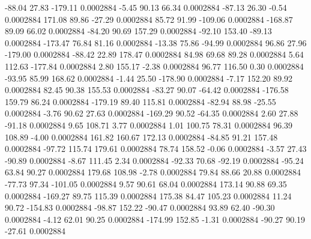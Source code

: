      -88.04       27.83     -179.11     0.0002884
       -5.45       90.13       66.34     0.0002884
      -87.13       26.30       -0.54     0.0002884
      171.08       89.86      -27.29     0.0002884
       85.72       91.99     -109.06     0.0002884
     -168.87       89.09       66.02     0.0002884
      -84.20       90.69      157.29     0.0002884
      -92.10      153.40      -89.13     0.0002884
     -173.47       76.84       81.16     0.0002884
      -13.38       75.86      -94.99     0.0002884
       96.86       27.96     -179.00     0.0002884
      -88.42       22.89      178.47     0.0002884
       84.98       69.68       89.28     0.0002884
        5.64      112.63     -177.84     0.0002884
        2.80      155.17       -2.38     0.0002884
       96.77      116.50        0.30     0.0002884
      -93.95       85.99      168.62     0.0002884
       -1.44       25.50     -178.90     0.0002884
       -7.17      152.20       89.92     0.0002884
       82.45       90.38      155.53     0.0002884
      -83.27       90.07      -64.42     0.0002884
     -176.58      159.79       86.24     0.0002884
     -179.19       89.40      115.81     0.0002884
      -82.94       88.98      -25.55     0.0002884
       -3.76       90.62       27.63     0.0002884
     -169.29       90.52      -64.35     0.0002884
        2.60       27.88      -91.18     0.0002884
        9.65      108.71        3.77     0.0002884
        1.01      100.75       78.31     0.0002884
       96.39      108.89       -4.00     0.0002884
      161.82      160.67      172.13     0.0002884
      -84.85       91.21      157.48     0.0002884
      -97.72      115.74      179.61     0.0002884
       78.74      158.52       -0.06     0.0002884
       -3.57       27.43      -90.89     0.0002884
       -8.67      111.45        2.34     0.0002884
      -92.33       70.68      -92.19     0.0002884
      -95.24       63.84       90.27     0.0002884
      179.68      108.98       -2.78     0.0002884
       79.84       88.66       20.88     0.0002884
      -77.73       97.34     -101.05     0.0002884
        9.57       90.61       68.04     0.0002884
      173.14       90.88       69.35     0.0002884
     -169.27       89.75      115.39     0.0002884
      175.38       84.47      105.23     0.0002884
       11.24       90.72     -154.83     0.0002884
      -98.87      152.22      -90.47     0.0002884
       93.89       62.40      -90.30     0.0002884
       -4.12       62.01       90.25     0.0002884
     -174.99      152.85       -1.31     0.0002884
      -90.27       90.19      -27.61     0.0002884
